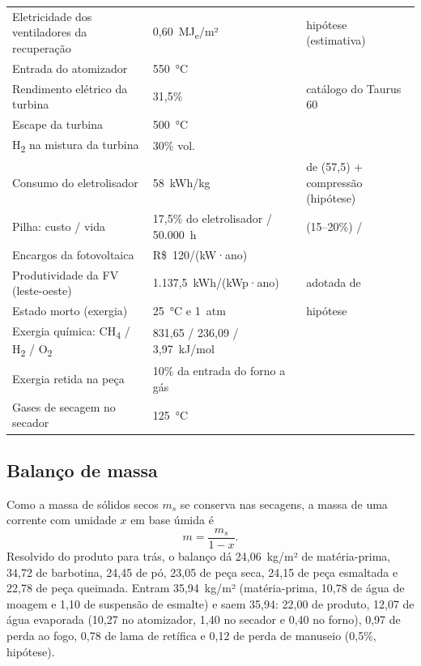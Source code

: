 \documentclass[10pt,a4paper,twocolumn]{article}
\newcommand{\MJe}{MJ\textsubscript{e}}
\newcommand{\Ht}{H\textsubscript{2}}
\newcommand{\Ot}{O\textsubscript{2}}
\begin{document}
\begin{table}[!t]
\begin{tabular}{L{3.85cm}L{2.05cm}L{1.95cm}}
Eletricidade dos ventiladores da recuperação & 0,60~\MJe/m² & hipótese (estimativa)\\
Entrada do atomizador & 550~°C & \cite{della2012}\\
Rendimento elétrico da turbina & 31,5\% & catálogo do Taurus 60 \cite{gtw2018,solar2026}\\
Escape da turbina & 500~°C & \cite{boyce2012}\\
\Ht{} na mistura da turbina & 30\% vol. & \cite{netl2022}\\
Consumo do eletrolisador & 58~kWh/kg & de \cite{iea2025b} (57,5) + compressão (hipótese)\\
Pilha: custo / vida & 17,5\% do eletrolisador / 50.000~h & \cite{iea2025a} (15--20\%) / \cite{iea2025b}\\
Encargos da fotovoltaica & R\$~120/(kW·ano) & \cite{epe2025}\\
Produtividade da FV (leste-oeste) & 1.137,5~kWh/\allowbreak{}(kWp·ano) & adotada de \cite{canalsolar2022,pvmag2021}\\
Estado morto (exergia) & 25~°C e 1~atm & hipótese\\
Exergia química: CH\textsubscript{4} / \Ht{} / \Ot & 831,65 / 236,09 / 3,97~kJ/mol & \cite{bejan1996}\\
Exergia retida na peça & 10\% da entrada do forno a gás & \cite{ferrer2019}\\
Gases de secagem no secador & 125~°C & \cite{mezquita2012}\\
\bottomrule
\end{tabular}
\end{table}

\subsection{Balanço de massa}

Como a massa de sólidos secos $m_s$ se conserva nas secagens, a massa de uma corrente com umidade $x$ em base úmida é
\begin{equation}
m = \frac{m_s}{1-x}. \label{eq:mtotal}
\end{equation}
Resolvido do produto para trás, o balanço dá 24,06~kg/m² de matéria-prima, 34,72 de barbotina, 24,45 de pó, 23,05 de peça seca, 24,15 de peça esmaltada e 22,78 de peça queimada. Entram 35,94~kg/m² (matéria-prima, 10,78 de água de moagem e 1,10 de suspensão de esmalte) e saem 35,94: 22,00 de produto, 12,07 de água evaporada (10,27 no atomizador, 1,40 no secador e 0,40 no forno), 0,97 de perda ao fogo, 0,78 de lama de retífica e 0,12 de perda de manuseio (0,5\%, hipótese).
\end{document}
